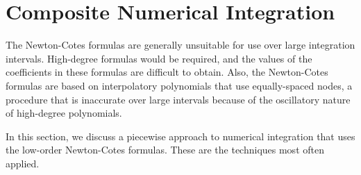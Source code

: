 \documentclass[12pt,a4paper]{article}
\begin{document}
\section{Composite Numerical Integration}
The Newton-Cotes formulas are generally unsuitable for use over large integration intervals. High-degree formulas would be required, and the values of the coefficients in these formulas are difficult to obtain. Also, the Newton-Cotes formulas are based on interpolatory polynomials that use equally-spaced nodes, a procedure that is inaccurate over large intervals because of the oscillatory nature of high-degree polynomials.

In this section, we discuss a piecewise approach to numerical integration that uses the low-order Newton-Cotes formulas. These are the techniques most often applied.
\end{document}
